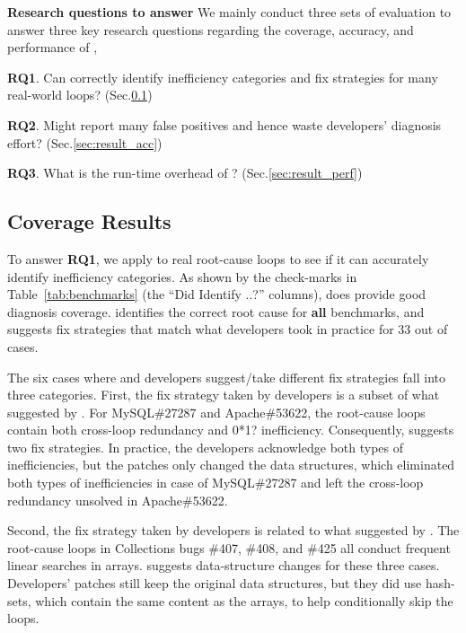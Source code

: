 
{\color{red}
\noindent\textbf{Research questions to answer}
We mainly conduct three sets of evaluation to answer three key research 
questions regarding the coverage, accuracy, and performance of \Tool, 

\textbf{RQ1}.
Can \Tool correctly identify inefficiency categories and fix 
strategies for many real-world loops? (Sec.\ref{sec:coverage})

\textbf{RQ2}.
Might \Tool report many false positives and hence waste developers' diagnosis
effort? (Sec.\ref{sec:result_acc})

\textbf{RQ3}.
What is the run-time overhead of \Tool? (Sec.\ref{sec:result_perf})
}


\subsection{Coverage Results}
\label{sec:coverage}
{\color{red}
To answer \textbf{RQ1}, we apply \Tool to real root-cause loops to see if 
it can accurately identify inefficiency categories.
As shown by the check-marks in Table~\ref{tab:benchmarks}
(the ``Did \Tool Identify ..?'' columns), 
\Tool does provide good diagnosis coverage.
}
\Tool identifies the correct root cause for \textbf{all} \allbugs benchmarks, and 
suggests fix strategies that match what developers took in practice
for 33 out of \allbugs cases. 

The six cases where \Tool and developers suggest/take different fix strategies
fall into three categories.
First, the fix strategy taken by developers is a subset of what suggested by 
\Tool.
For MySQL\#27287 and Apache\#53622, the root-cause loops contain both
cross-loop redundancy and 0*1? inefficiency. Consequently, \Tool suggests two
fix strategies. In practice, the developers
acknowledge both types of inefficiencies, but the patches
only changed the data structures, which eliminated both types of inefficiencies 
in case of MySQL\#27287 and left the cross-loop redundancy unsolved in
Apache\#53622. 

Second, the fix strategy taken by developers is related to
what suggested by \Tool.
The root-cause loops in 
Collections bugs \#407, \#408, and \#425 all conduct frequent linear searches in arrays.
\Tool suggests data-structure changes for these three cases. Developers' patches 
still keep the original data structures, but they
did use hash-sets, which contain the same content as the arrays,
to help conditionally skip the loops. 


